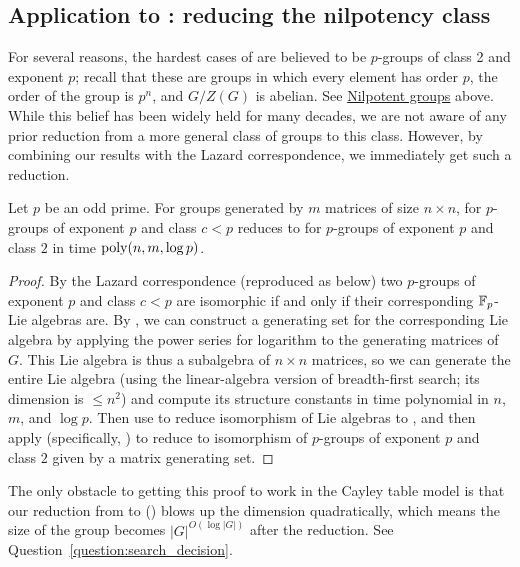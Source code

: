 \subsection{Application to \GpIlong: reducing the nilpotency class}
For several reasons, the hardest cases of \GpIlong are believed to be $p$-groups 
of class 2 and exponent $p$; recall that these are groups in which every element 
has order $p$, the order of the group is $p^n$, and $G/Z(G)$ is abelian. See 
\hyperref{}{}{sec:problems:nilpotent}{Nilpotent groups} above. While this belief  
has been widely held for many decades, we are not aware of any prior reduction 
from a more general 
class of groups to this class. However, by combining our results with the Lazard 
correspondence, we immediately get such a reduction.

\begin{corp}
Let $p$ be an odd prime. 
For groups generated by $m$ matrices of size $n \times n$, \GpIlong for $p$-groups 
of exponent $p$ and class $c < p$ reduces to \GpIlong for $p$-groups of exponent 
$p$ and class $2$ in time $\mathrm{poly}(n, m, \log p)$.
\end{corp}

\begin{proof}
By the Lazard correspondence 
(reproduced as  below) 
two $p$-groups of exponent $p$ and class $c < p$ are isomorphic if and only if 
their corresponding $\mathbb{F}_p$-Lie algebras are. 
By , we can construct a generating set for the 
corresponding Lie algebra by applying the power series for logarithm to the 
generating matrices of $G$. This Lie algebra is thus a subalgebra of $n \times n$ 
matrices, so we can generate the entire Lie algebra (using the linear-algebra 
version of breadth-first search; its dimension is $\leq n^2$) and compute its 
structure constants in time polynomial in $n$, $m$, and $\log p$. 
Then use \cite{FGS19} to reduce isomorphism of Lie 
algebras to \TI, and then apply  (specifically, ) to reduce to isomorphism of 
$p$-groups of exponent $p$ and class $2$ given by a matrix generating set.
\end{proof}

The only obstacle to getting this proof to work in the Cayley table model is that 
our reduction from \TI to \AltMatSpIsomlong () blows 
up the dimension quadratically, which means the size of the group becomes 
$|G|^{O(\log |G|)}$ after the reduction. See 
Question~\ref{question:search_decision}. 



